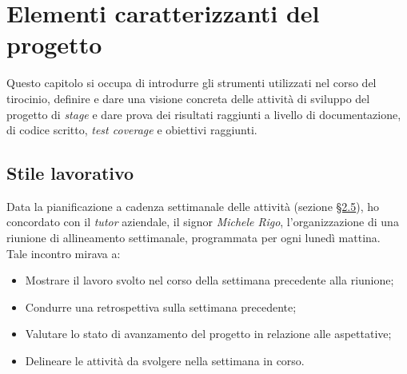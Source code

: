 \chapter{Elementi caratterizzanti del progetto}
\label{cap:elementi-progetto}
Questo capitolo si occupa di introdurre gli strumenti utilizzati nel corso del tirocinio, definire e dare una visione concreta delle attività di sviluppo del progetto di \textit{stage} e dare prova dei risultati raggiunti
a livello di documentazione, di codice scritto, \textit{test coverage} e obiettivi raggiunti.

\section{Stile lavorativo}

Data la pianificazione a cadenza settimanale delle attività (sezione \hyperref[sec:pianificazione]{§2.5}), ho concordato con il \textit{tutor} aziendale, il signor \textit{Michele Rigo}, l'organizzazione di una riunione di allineamento settimanale, programmata per ogni lunedì mattina. \\
Tale incontro mirava a:
\begin{itemize}
    \item Mostrare il lavoro svolto nel corso della settimana precedente alla riunione;
    \item Condurre una retrospettiva sulla settimana precedente;
    \item Valutare lo stato di avanzamento del progetto in relazione alle aspettative;
    \item Delineare le attività da svolgere nella settimana in corso.
\end{itemize}

